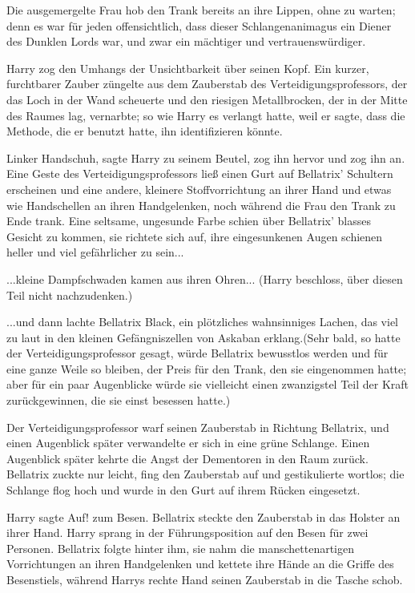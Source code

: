 Die ausgemergelte Frau hob den Trank bereits an ihre Lippen, ohne zu warten;
denn es war für jeden offensichtlich, dass dieser Schlangenanimagus ein Diener
des Dunklen Lords war, und zwar ein mächtiger und vertrauenswürdiger.

Harry zog den Umhangs der Unsichtbarkeit über seinen Kopf. Ein kurzer,
furchtbarer Zauber züngelte aus dem Zauberstab des Verteidigungsprofessors, der
das Loch in der Wand scheuerte und den riesigen Metallbrocken, der in der Mitte
des Raumes lag, vernarbte; so wie Harry es verlangt hatte, weil er sagte, dass
die Methode, die er benutzt hatte, ihn identifizieren könnte.

\glqq{}Linker Handschuh\grqq{}, sagte Harry zu seinem Beutel, zog ihn hervor und
zog ihn an. Eine Geste des Verteidigungsprofessors ließ einen Gurt auf
Bellatrix' Schultern erscheinen und eine andere, kleinere Stoffvorrichtung an
ihrer Hand und etwas wie Handschellen an ihren Handgelenken, noch während die
Frau den Trank zu Ende trank. Eine seltsame, ungesunde Farbe schien über
Bellatrix' blasses Gesicht zu kommen, sie richtete sich auf, ihre eingesunkenen
Augen schienen heller und viel gefährlicher zu sein...

...kleine Dampfschwaden kamen aus ihren Ohren... (Harry beschloss, über diesen
Teil nicht nachzudenken.)

...und dann lachte Bellatrix Black, ein plötzliches wahnsinniges Lachen, das
viel zu laut in den kleinen Gefängniszellen von Askaban erklang.(Sehr bald, so
hatte der Verteidigungsprofessor gesagt, würde Bellatrix bewusstlos werden und
für eine ganze Weile so bleiben, der Preis für den Trank, den sie eingenommen
hatte; aber für ein paar Augenblicke würde sie vielleicht einen zwanzigstel Teil
der Kraft zurückgewinnen, die sie einst besessen hatte.)

Der Verteidigungsprofessor warf seinen Zauberstab in Richtung Bellatrix, und
einen Augenblick später verwandelte er sich in eine grüne Schlange. Einen
Augenblick später kehrte die Angst der Dementoren in den Raum zurück. Bellatrix
zuckte nur leicht, fing den Zauberstab auf und gestikulierte wortlos; die
Schlange flog hoch und wurde in den Gurt auf ihrem Rücken eingesetzt.

Harry sagte \glqq{}Auf!\grqq{} zum Besen. Bellatrix steckte den Zauberstab in das
Holster an ihrer Hand. Harry sprang in der Führungsposition auf den Besen für
zwei Personen. Bellatrix folgte hinter ihm, sie nahm die manschettenartigen
Vorrichtungen an ihren Handgelenken und kettete ihre Hände an die Griffe des
Besenstiels, während Harrys rechte Hand seinen Zauberstab in die Tasche schob.

